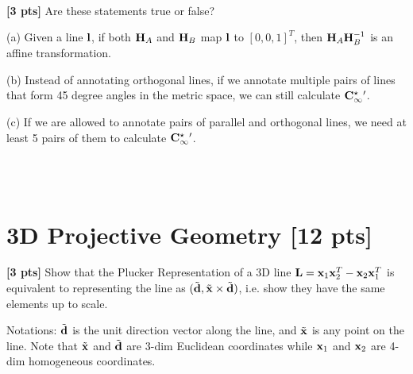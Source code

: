 \documentclass[11pt,addpoints,answers]{exam}
\numberwithin{equation}{section} %
\numberwithin{figure}{section} %
\numberwithin{table}{section} %
\begin{document}
\begin{questions}
\begin{tcolorbox}[fit,height=2cm, width=\textwidth, blank, borderline={0.5pt}{-2pt},halign=left, valign=center, nobeforeafter]
\\
\\
\\
\end{tcolorbox}

\question \textbf{[3 pts]} Are these statements true or false?


(a) Given a line $\mathbf{l}$, if both $\mathbf{H}_A$ and $\mathbf{H}_B$ map $\mathbf{l}$ to $[0,0,1]^T$, then $\mathbf{H}_A\mathbf{H}_B^{-1}$ is an affine transformation. 

(b) Instead of annotating orthogonal lines, if we annotate multiple pairs of lines that form 45 degree angles in the metric space, we can still calculate $\mathbf{C}_\infty^{\star}{}'$.

(c) If we are allowed to annotate pairs of parallel and orthogonal lines, we need at least 5 pairs of them to calculate $\mathbf{C}_\infty^{\star}{}'$.

\begin{tcolorbox}[fit,height=2cm, width=\textwidth, blank, borderline={0.5pt}{-2pt},halign=left, valign=center, nobeforeafter]
\\
\\
\end{tcolorbox}


\section{3D Projective Geometry [12 pts]}

\question \textbf{[3 pts]} Show that the Plucker Representation of a 3D line $\mathbf{L} = \mathbf{x}_1\mathbf{x}_2^T - \mathbf{x}_2\mathbf{x}_1^T$ is equivalent to representing the line as $(\tilde {\mathbf{d}}, \tilde {\mathbf{x}} \times \tilde {\mathbf{d}})$, i.e. show they have the same elements up to scale.

Notations: $\tilde{\mathbf{d}}$ is the unit direction vector along the line, and $\tilde {\mathbf{x}}$ is any point on the line. Note that $\tilde{\mathbf{x}}$ and $\tilde{\mathbf{d}}$ are 3-dim Euclidean coordinates while $\mathbf{x}_1$ and $\mathbf{x}_2$ are 4-dim homogeneous coordinates.

\begin{tcolorbox}[fit,height=7cm, width=\textwidth, blank, borderline={0.5pt}{-2pt},halign=left, valign=center, nobeforeafter]


\end{tcolorbox}
\end{questions}
\end{document}

